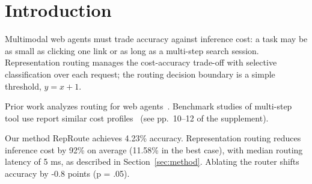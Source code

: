 \newcommand{\method}{RepRoute}

\section{Introduction}\label{sec:intro}

Multimodal web agents must trade accuracy against inference cost: a task may
be as small as clicking one link or as long as a multi-step search session.
Representation routing manages the cost-accuracy trade-off with selective
classification over each request; the routing decision boundary is a simple
threshold, $y = x + 1$.

Prior work analyzes routing for web agents~\cite{wang2025routing}.
Benchmark studies of multi-step tool use report similar cost
profiles~\cite{chen2024agents} (see pp.~10--12 of the supplement).

Our method \method{} achieves 4.23\% accuracy. Representation routing reduces
inference cost by 92\% on average (11.58\% in the best case), with median
routing latency of 5 ms, as described in Section~\ref{sec:method}. Ablating
the router shifts accuracy by -0.8 points (p = .05).
